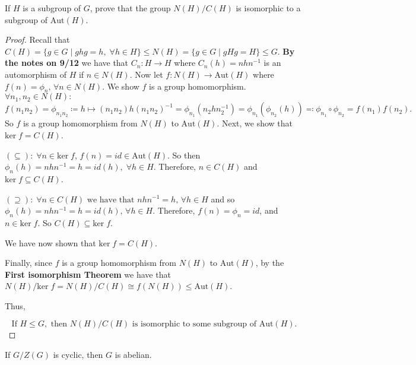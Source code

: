 \documentclass[addpoints,10pt]{exam}
\theoremstyle{plain}
\theoremstyle{definition}
\newtheorem{prob}[thm]{Problem}
\theoremstyle{plain}
\theoremstyle{plain}
\theoremstyle{definition}
\let\oldprob\prob
\let\endoldprob\endprob
\renewenvironment{prob}
  {\begin{singlespace}\oldprob}
  {\endoldprob\end{singlespace}}
\newcommand{\belowtitle}{\leavevmode\newline}
\begin{document}
\setcounter{thm}{25}   %
\begin{prob}\belowtitle If $H$ is a subgroup of $G$, prove that the group $N(H)/C(H)$ is isomorphic to a subgroup of $\mathrm{Aut}(H)$.\end{prob}
\begin{proof}
  Recall that $C(H)=\{g\in G\mid ghg=h,\;\forall h\in H\}\leq N(H)=\{g\in G\mid gHg=H\}\leq G$. \textbf{By the notes on 9/12} we have that $C_{n}:H\to H$ where $C_{n}(h)=nhn^{-1}$ is an automorphism of $H$ if $n\in N(H)$. Now let $f:N(H)\to \mathrm{Aut}(H)$ where $f(n)=\phi_{n},\,\forall n\in N(H)$. We show $f$ is a group homomorphism. $\forall n_{1},n_{2}\in N(H):$
    $$f(n_{1}n_{2})=\phi_{n_{1}n_{2}}\coloneq h\mapsto (n_{1}n_{2}) h (n_{1}n_{2})^{-1}=\phi_{n_{1}}(n_{2}hn_{2}^{-1})=\phi_{n_{1}}(\phi_{n_{2}}(h))\eqcolon\phi_{n_{1}}\circ \phi_{n_{2}}=f(n_{1})f(n_{2}).$$
  So $f$ is a group homomorphism from $N(H)$ to $\mathrm{Aut}(H)$. Next, we show that $\mathrm{ker}\;f=C(H)$.

  $\mathbf{(\subseteq)}:\;\forall n\in \mathrm{ker}\;f$, $f(n)=id\in \mathrm{Aut}(H)$. So then $\phi_{n}(h)=nhn^{-1}=h=id(h),\;\forall h\in H$. Therefore, $n\in C(H)$ and $\mathrm{ker}\; f\subseteq C(H)$. 

  $\mathbf{(\supseteq)}:\;\forall n\in C(H)\text{ we have that }nhn^{-1}=h,\,\forall h\in H$ and so $\phi_{n}(h)=nhn^{-1}=h=id(h),\, \forall h\in H.$ Therefore, $f(n)=\phi_{n}=id$, and $n\in \mathrm{ker}\; f.$ So $C(H)
  \subseteq \mathrm{ker}\;f$.

  We have now shown that $\mathrm{ker}\;f=C(H)$.

  Finally, since $f$ is a group homomorphism from $N(H)$ to $\mathrm{Aut}(H)$, by the \textbf{First isomorphism Theorem} we have that $N(H)/\mathrm{ker}\;f=N(H)/C(H)\cong f(N(H))\leq \mathrm{Aut}(H)$.

  Thus,

  $$\text{If }H\leq G,\text{ then }N(H)/C(H)\text{ is isomorphic to some subgroup of }\mathrm{Aut}(H).$$
\end{proof}
\newpage
\begin{prob}\belowtitle If $G/Z(G)$ is cyclic, then $G$ is abelian.\end{prob}
\end{document}
